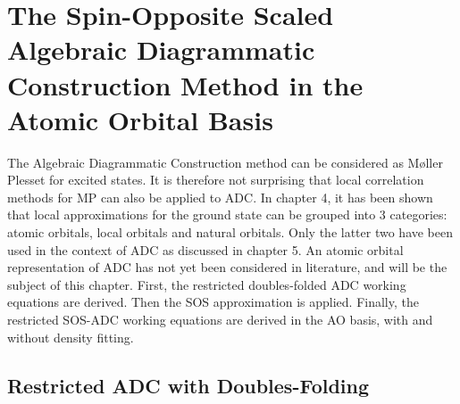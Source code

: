 \chapter{The Spin-Opposite Scaled Algebraic Diagrammatic Construction Method in the Atomic Orbital Basis \label{cha:AOADC}}

The Algebraic Diagrammatic Construction method can be considered as M{\o}ller Plesset for excited states. It is therefore not surprising that local correlation methods for MP can also be applied to ADC. In chapter 4, it has been shown that local approximations for the ground state can be grouped into 3 categories: atomic orbitals, local orbitals and natural orbitals. Only the latter two have been used in the context of ADC as discussed in chapter 5. An atomic orbital representation of ADC has not yet been considered in literature, and will be the subject of this chapter. First, the restricted doubles-folded ADC working equations are derived. Then the SOS approximation is applied. Finally, the restricted SOS-ADC working equations are derived in the AO basis, with and without density fitting. 

\section{Restricted ADC with Doubles-Folding}

